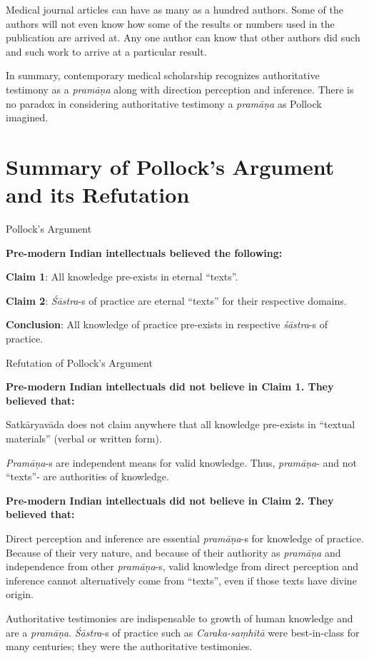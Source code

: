Medical journal articles can have as many as a hundred authors. Some of the authors will not even know how some of the results or numbers used in the publication are arrived at. Any one author can know that other authors did such and such work to arrive at a particular result.

In summary, contemporary medical scholarship recognizes authoritative testimony as a {\sl pramāṇa} along with direction perception and inference. There is no paradox in considering authoritative testimony a {\sl pramāṇa} as Pollock imagined.


\section*{Summary of Pollock's Argument and its Refutation}

Pollock's Argument

{\bf Pre-modern Indian intellectuals believed the following:}

{\bf Claim 1}: All knowledge pre-exists in eternal ``texts''.  

{\bf Claim 2}: {\sl Śāstra}-s of practice are eternal ``texts'' for their respective domains.

{\bf Conclusion}:  All knowledge of practice pre-exists in respective {\sl śāstra}-s of practice. 

Refutation of Pollock's Argument

{\bf Pre-modern Indian intellectuals did not believe in Claim 1.  They believed that:}

Satkāryavāda does not claim anywhere that all knowledge pre-exists in ``textual materials'' (verbal or written form).

{\sl Pramāņa}-s are independent means for valid knowledge. Thus, {\sl pramāṇa}- and not ``texts''- are authorities of knowledge.

{\bf Pre-modern Indian intellectuals did not believe in Claim 2.  They believed that:}

\newpage

Direct perception and inference are essential {\sl pramāṇa}-s for knowledge of practice.  Because of their very nature, and because of their authority as {\sl pramāṇa} and independence from other {\sl pramāṇa}-s, valid knowledge from direct perception and inference cannot alternatively come from ``texts'', even if those texts have divine origin.

Authoritative testimonies are indispensable to growth of human knowledge and are a {\sl pramāṇa}.  {\sl Śāstra}-s of practice such as {\sl Caraka-saṃhitā} were best-in-class for many centuries; they were the authoritative testimonies.

